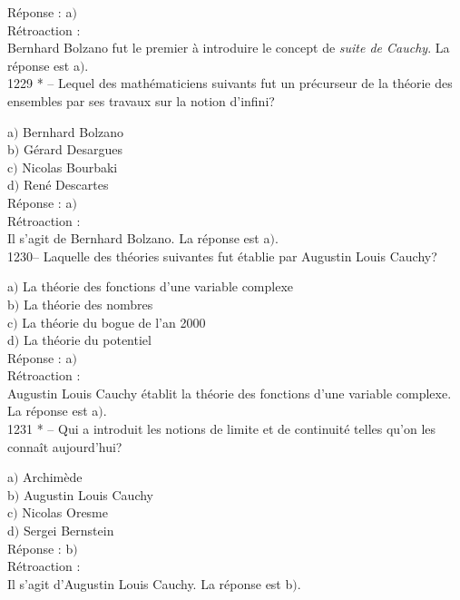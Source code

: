 ﻿\documentclass[letterpaper, 12pt]{article}
\begin{document}
R\'eponse : a$)$\\

R\'etroaction : \\
Bernhard Bolzano fut le premier \`a introduire le concept de {\sl
suite de Cauchy}.
La r\'eponse est a$)$.\\

1229 * -- Lequel des math\'ematiciens suivants fut un pr\'ecurseur
de la th\'eorie des ensembles par ses travaux sur la notion
d'infini?

a$)$ Bernhard Bolzano \\
b$)$ G\'erard Desargues \\
c$)$ Nicolas Bourbaki \\
d$)$ Ren\'e Descartes\\

R\'eponse : a$)$\\

R\'etroaction : \\
Il s'agit de Bernhard Bolzano.
La r\'eponse est a$)$.\\

1230-- Laquelle des th\'eories suivantes fut \'etablie par Augustin
Louis Cauchy?

a$)$ La th\'eorie des fonctions d'une variable complexe \\
b$)$ La th\'eorie des nombres \\
c$)$ La th\'eorie du bogue de l'an 2000 \\
d$)$ La th\'eorie du potentiel\\

R\'eponse : a$)$\\

R\'etroaction : \\
Augustin Louis Cauchy \'etablit la th\'eorie des fonctions d'une
variable complexe.
La r\'eponse est a$)$.\\

1231 * -- Qui a introduit les notions de limite et de continuit\'e
telles qu'on les conna\^it aujourd'hui?

a$)$ Archim\`ede \\
b$)$ Augustin Louis Cauchy \\
c$)$ Nicolas Oresme \\
d$)$ Sergei Bernstein\\

R\'eponse : b$)$\\

R\'etroaction : \\
Il s'agit d'Augustin Louis Cauchy.
La r\'eponse est b$)$.\\
\end{document}
